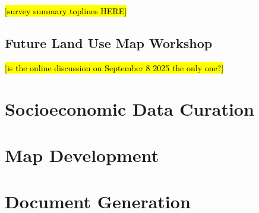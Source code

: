 \noindent \hl{[survey summary toplines HERE]}

\pagebreak
\subsection{Future Land Use Map Workshop}

\noindent \hl{[is the online discussion on September 8 2025 the only one?]}

\section{Socioeconomic Data Curation}

\section{Map Development}

\section{Document Generation}

